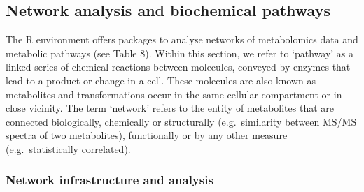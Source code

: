 \documentclass[]{article}
\begin{document}
\newpage

\hypertarget{network-analysis-and-biochemical-pathways}{%
\subsection{Network analysis and biochemical pathways}\label{network-analysis-and-biochemical-pathways}}

The R environment offers packages to analyse networks of metabolomics data and metabolic pathways (see Table 8). Within this section, we refer to `pathway' as a linked series of chemical reactions between molecules, conveyed by enzymes that lead to a product or change in a cell. These molecules are also known as metabolites and transformations occur in the same cellular compartment or in close vicinity. The term `network' refers to the entity of metabolites that are connected biologically, chemically or structurally (e.g.~similarity between MS/MS spectra of two metabolites), functionally or by any other measure (e.g.~statistically correlated).

\hypertarget{network-infrastructure-and-analysis}{%
\subsubsection{Network infrastructure and analysis}\label{network-infrastructure-and-analysis}}
\end{document}
